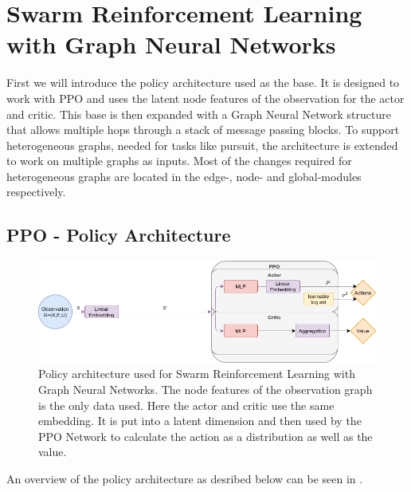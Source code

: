 
\chapter{Swarm Reinforcement Learning with Graph Neural Networks}
\label{ch:Architecture}
First we will introduce the policy architecture used as the base. It is designed to work with PPO and uses the latent node features of the observation for the actor and critic. This base is then expanded with a Graph Neural Network structure that allows multiple hops through a stack of message passing blocks. To support heterogeneous graphs, needed for tasks like pursuit, the architecture is extended to work on multiple graphs as inputs. Most of the changes required for heterogeneous graphs are located in the edge-, node- and global-modules respectively.



\section{PPO - Policy Architecture}
\begin{figure}[htp]
    \centering
    \includegraphics[width=1.0\textwidth]{figures/PPO_no_message_passing.png}
    \hspace{1cm}   
    \caption{Policy architecture used for Swarm Reinforcement Learning with Graph Neural Networks. The node features of the observation graph is the only data used. Here the actor and critic use the same embedding. It is put into a latent dimension and then used by the PPO Network to calculate the action as a distribution as well as the value.}
    \label{fig:PPO_no_message_passing}
\end{figure}

An overview of the policy architecture as desribed below can be seen in .

